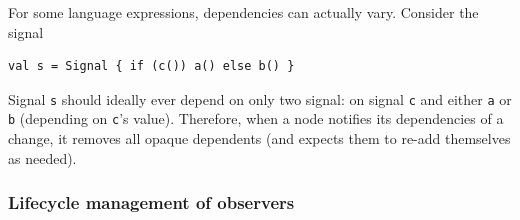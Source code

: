 For some language expressions, dependencies can actually vary. Consider the signal
\begin{lstlisting}
val s = Signal { if (c()) a() else b() }
\end{lstlisting}
Signal \texttt{s} should ideally ever depend on only two signal: on signal \texttt{c} and either \texttt{a} or \texttt{b} (depending on \texttt{c}'s value). Therefore, when a node notifies its dependencies of a change, it removes all opaque dependents (and expects them to re-add themselves as needed).


\subsubsection{Lifecycle management of observers}




















